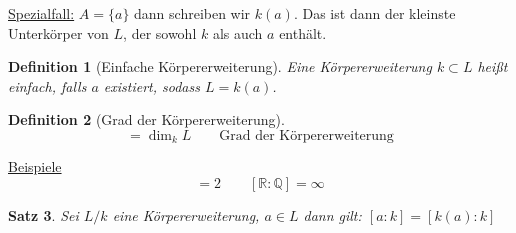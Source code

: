 \documentclass[a4paper,12pt,numbers=noenddot,parskip=full]{scrartcl}
\newcommand{\setQ}{\mathbb{Q}}
\newcommand{\setR}{\mathbb{R}}
\newcommand{\setC}{\mathbb{C}}
\newcommand{\heading}{\underline}
\theoremstyle{dotless}
\newtheorem{theorem}{Satz}[section]
\newtheorem{definition}[theorem]{Definition}
\theoremstyle{remark}
\begin{document}
	\heading{Spezialfall:} $A = \{ a \}$ dann schreiben wir $k(a)$. Das ist dann der kleinste Unterkörper von $L$, der sowohl $k$ als auch $a$ enthält.
	
	\begin{definition}[Einfache Körpererweiterung]
		Eine Körpererweiterung $k \subset L$ heißt einfach, falls $a$ existiert, sodass $L = k(a)$.
	\end{definition}

	\begin{definition}[Grad der Körpererweiterung]
		\begin{equation*}
			[L:k] = \dim_k L \qquad \text{Grad der Körpererweiterung}
		\end{equation*}
	\end{definition}

	\heading{Beispiele}
	\begin{equation*}
		[\setC : \setR] = 2 \qquad [\setR: \setQ]  = \infty
	\end{equation*}
	
	\begin{theorem}
		Sei $L/k$ eine Körpererweiterung, $a \in L$ dann gilt:
		$
			[a: k] = [k(a): k]
 		$
	\end{theorem}
\end{document}
